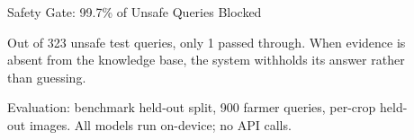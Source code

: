 \documentclass[final]{beamer}
\newlength{\sepwidth}\setlength{\sepwidth}{0.017\paperwidth}
\newlength{\colwidth}\setlength{\colwidth}{0.1796\paperwidth}
\newcommand{\separatorcolumn}{\begin{column}{\sepwidth}\end{column}}
\begin{document}
\begin{frame}[t]
\begin{columns}[t]
\begin{column}{\colwidth}
  \begin{alertblock}{Safety Gate: 99.7\% of Unsafe Queries Blocked}
    \begin{center}
    \end{center}
    \vspace{0.3ex}
    {\small Out of 323 unsafe test queries, only 1 passed through.
    When evidence is absent from the knowledge base, the system
    withholds its answer rather than guessing.}
  \end{alertblock}

  {\scriptsize\sffamily Evaluation: benchmark held-out split, 900 farmer queries,
  per-crop held-out images. All models run on-device; no API calls.}

\end{column}

\separatorcolumn

\begin{column}{\colwidth}


\end{column}
\end{columns}
\end{frame}
\end{document}
